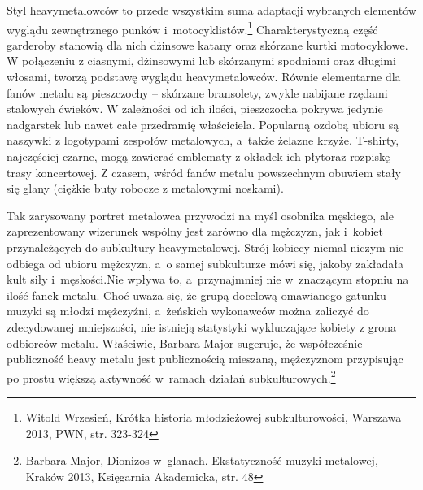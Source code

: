 \documentclass[12pt, a4paper, titlepage]{report}
\begin{document}
Styl heavymetalowców to przede wszystkim suma adaptacji wybranych elementów wyglądu zewnętrznego punków i~motocyklistów.\footnote{Witold Wrzesień, Krótka historia młodzieżowej subkulturowości, Warszawa 2013, PWN, \break str. 323-324} Charakterystyczną \break część garderoby stanowią dla nich dżinsowe katany oraz skórzane kurtki motocyklowe. W połączeniu z ciasnymi, dżinsowymi lub skórzanymi spodniami oraz długimi włosami, tworzą podstawę wyglądu heavymetalowców. Równie elementarne dla fanów metalu są pieszczochy -- skórzane bransolety, zwykle nabijane rzędami stalowych ćwieków. W zależności od ich ilości, pieszczocha pokrywa jedynie nadgarstek lub nawet całe przedramię właściciela. Popularną ozdobą ubioru są naszywki z logotypami zespołów metalowych, a~także żelazne krzyże. T-shirty, najczęściej czarne, mogą zawierać emblematy z okładek ich płyt\footnotemark[\value{footnote}] oraz rozpiskę trasy koncertowej. %
Z czasem, wśród fanów metalu powszechnym obuwiem stały się glany (ciężkie buty robocze z metalowymi noskami). 

Tak zarysowany portret metalowca przywodzi na myśl osobnika męskiego,  ale zaprezentowany wizerunek wspólny jest zarówno dla mężczyzn, jak i~kobiet przynależących do subkultury heavymetalowej. Strój kobiecy niemal niczym nie odbiega od ubioru mężczyzn, a~o samej subkulturze mówi się, jakoby zakładała kult siły i~męskości.\footnotemark[\value{footnote}] Nie wpływa to, a~przynajmniej nie w~znaczącym stopniu na ilość fanek metalu. Choć uważa się, że grupą docelową omawianego gatunku muzyki są młodzi mężczyźni, a~żeńskich wykonawców można zaliczyć do zdecydowanej mniejszości, nie istnieją statystyki wykluczające kobiety z grona odbiorców metalu. Właściwie, Barbara Major sugeruje, że współcześnie publiczność heavy metalu jest publicznością mieszaną, mężczyznom przypisując po prostu większą aktywność w~ramach działań subkulturowych.\footnote{Barbara Major, Dionizos w~glanach. Ekstatyczność muzyki metalowej, Kraków 2013, Księgarnia Akademicka, str. 48} 

\end{document}

